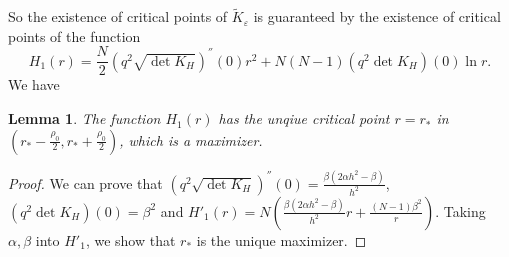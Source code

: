 \documentclass[12pt,reqno]{amsart}
\numberwithin{equation}{section}
\newtheorem{lemma}[theorem]{Lemma}
\theoremstyle{definition}
\theoremstyle{remark}
\begin{document}
 So the existence of critical points of  $ \tilde{K}_\varepsilon $ is guaranteed by the existence of critical points of the function 
$$H_1(r)=\frac{N}{2} \left(q^2\sqrt{\det K_H} \right)^{''}(0 )r^2+N(N-1)\left( q^2  \det K_H\right)(0)\ln r.$$
We have
\begin{lemma}\label{lm701}
The function 
$ H_1(r) $
has the unqiue critical point $ r=r_* $ in $  \left( r_*-\frac{\rho_0}{2},r_*+\frac{\rho_0}{2} \right) $, which is a maximizer.
\end{lemma}  
\begin{proof}
We can prove that $  \left(q^2\sqrt{\det K_H} \right)^{''}(0 )=\frac{\beta(2\alpha h^2-\beta)}{h^2} $, $ \left( q^2  \det K_H\right)(0)=\beta^2 $ and $ H'_1(r)=N\left(\frac{\beta(2\alpha h^2-\beta)}{h^2} r+\frac{(N-1)\beta^2}{r} \right)  $. Taking $ \alpha,\beta $ into $ H'_1 $, we show that $ r_* $ is the unique maximizer.
\end{proof}
\end{document}
